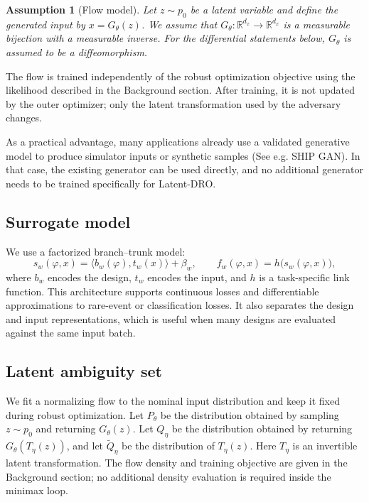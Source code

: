 \documentclass[11pt]{article}
\newtheorem{assumption}{Assumption}
\newcommand{\R}{\mathbb{R}}
\newcommand{\design}{\varphi}
\newcommand{\surr}{f_w}
\begin{document}
\begin{assumption}[Flow model]
\label{ass:flow}
Let $z\sim p_0$ be a latent variable and define the generated input by
$x=G_\theta(z)$. We assume that
$G_\theta:\R^{d_x}\to\R^{d_x}$ is a measurable bijection with a measurable inverse. For the
differential statements below, $G_\theta$ is assumed to be a diffeomorphism.
\end{assumption}

The flow is trained independently of the robust optimization objective using the likelihood
described in the Background section. After training, it is not updated by the outer optimizer;
only the latent transformation used by the adversary changes.

As a practical advantage, many applications already use a validated generative model to
produce simulator inputs or synthetic samples (See e.g. SHIP GAN). In that case, the existing generator can be
used directly, and no additional generator needs to be trained specifically for Latent-DRO.

\subsection{Surrogate model}

We use a factorized branch--trunk model:
\begin{equation}
  \label{eq:factorized}
  s_w(\design,x) = \langle b_w(\design),t_w(x)\rangle+\beta_w,
  \qquad \surr(\design,x)=h\big(s_w(\design,x)\big),
\end{equation}
where $b_w$ encodes the design, $t_w$ encodes the input, and $h$ is a task-specific link
function. This architecture supports continuous losses and differentiable approximations to
rare-event or classification losses. It also separates the design and input representations,
which is useful when many designs are evaluated against the same input batch.

\subsection{Latent ambiguity set}
\label{sec:invariance}

We fit a normalizing flow to the nominal input distribution and keep it fixed during robust
optimization. Let $P_\theta$ be the distribution obtained by sampling $z\sim p_0$ and
returning $G_\theta(z)$. Let $Q_\eta$ be the distribution obtained by returning
$G_\theta(T_\eta(z))$, and let $\widetilde Q_\eta$ be the distribution of $T_\eta(z)$.
Here $T_\eta$ is an invertible latent transformation. The flow density and training objective
are given in the Background section; no additional density evaluation is required inside the
minimax loop.
\end{document}

